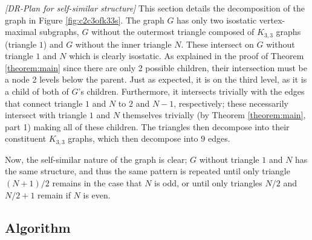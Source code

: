 \myexample
\textsl{[DR-Plan for self-similar structure]}
This section details the decomposition of the graph in Figure \ref{fig:c2c3ofk33s}. The graph $G$ has only two isostatic vertex-maximal subgraphs, $G$ without the outermost triangle composed of $K_{3,3}$ graphs (triangle $1$) and $G$ without the inner triangle $N$. These intersect on $G$ without triangle $1$ and $N$ which is clearly isostatic. As explained in the proof of Theorem \ref{theorem:main} since there are only 2 possible children, their intersection must be a node 2 levels below the parent. Just as expected, it is on the third level, as it is a child of both of $G$'s children. Furthermore, it intersects trivially with the edges that connect triangle $1$ and $N$ to $2$ and $N-1$, respectively; these necessarily intersect with triangle $1$ and $N$ themselves trivially (by Theorem \ref{theorem:main}, part 1) making all of these children. The triangles then decompose into their constituent $K_{3,3}$ graphs, which then decompose into 9 edges.

Now, the self-similar nature of the graph is clear; $G$ without triangle $1$ and $N$ has the same structure, and thus the same pattern is repeated until only triangle $(N+1)/2$ remains in the case that $N$ is odd, or until only triangles $N/2$ and $N/2+1$ remain if $N$ is even.









\subsection{Algorithm}



